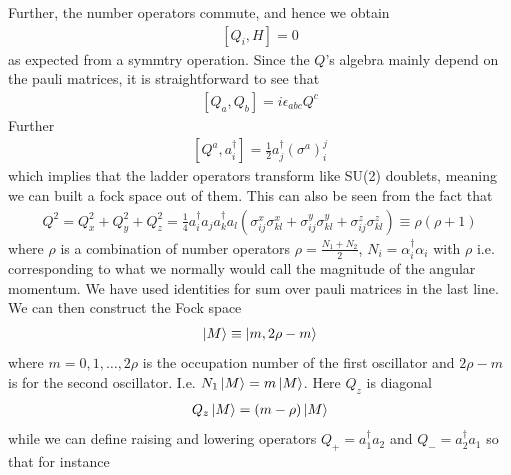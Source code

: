 \documentclass[a4paper,12pt]{article}
\begin{document}
Further, the number operators commute, and hence we obtain
\begin{equation}
	\begin{aligned}
		[Q_i,H]=0
	\end{aligned}
\end{equation}
as expected from a symmtry operation. Since the $Q$'s algebra mainly depend on the pauli matrices, it is straightforward to see that
\begin{equation}
	\begin{aligned}
		\left[Q_a,Q_b\right]=i \epsilon_{abc}Q^c
	\end{aligned}
\end{equation}
Further
\begin{equation}
	\begin{aligned}
		\left[Q^a,a_i^\dagger\right]=\frac{1}{2}a_j^\dagger (\sigma^a)^j_i
	\end{aligned}
\end{equation}
which implies that the ladder operators transform like SU(2) doublets, meaning we can built a fock space out of them. This can also be seen from the fact that
\begin{equation}
	\begin{aligned}
		Q^2=Q_x^2+Q_y^2+Q_z^2=\frac{1}{4}a_i^\dagger a_j a_k^\dagger a_l \left(\sigma^x_{ij}\sigma^x_{kl}+\sigma^y_{ij}\sigma^y_{kl}+\sigma^z_{ij}\sigma^z_{kl}\right)\equiv\rho(\rho+1)
	\end{aligned}
\end{equation}
where $\rho$ is a combination of number operators $\rho=\frac{N_1+N_2}{2}$, $N_i=\alpha_i^\dagger \alpha_i$ with $\rho$ i.e. corresponding to what we normally would call the magnitude of the angular momentum. We have used identities for sum over pauli matrices in the last line. We can then construct the Fock space
\begin{equation}
	\begin{aligned}
		\ket{M}\equiv \ket{m,2\rho-m}
	\end{aligned}
\end{equation}
where $m=0,1,\dots,2\rho$ is the occupation number of the first oscillator and $2\rho-m$ is for the second oscillator. I.e. $N_1\ket{M}=m\ket{M}$. Here $Q_z$ is diagonal
\begin{equation}
	\begin{aligned}
		Q_z\ket{M}=(m-\rho)\ket{M}
	\end{aligned}
\end{equation}
while we can define raising and lowering operators $Q_+=a_1^\dagger a_2$ and $Q_-=a_2^\dagger a_1$ so that for instance
\end{document}
